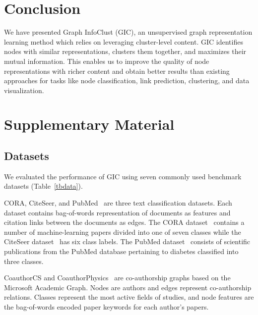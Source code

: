 \documentclass{article}
\begin{document}
\section{Conclusion}
We have presented Graph InfoClust (GIC), an unsupervised graph representation learning method which relies on leveraging cluster-level content. GIC identifies nodes with similar representations, clusters them together, and maximizes their mutual information. This enables us to improve the quality of node representations with richer content and obtain better results than existing approaches for tasks like node classification, link prediction, clustering, and data visualization. 







  



\clearpage
\section{Supplementary Material}









\subsection{Datasets}

We evaluated the performance of GIC using seven commonly used benchmark datasets (Table~\ref{tbdata}). 

CORA, CiteSeer, and PubMed~\cite{sen2008collective,yang2016planetoid} are three text classification datasets.  Each dataset contains bag-of-words representation of documents as features and citation links between the documents as edges. The CORA dataset~\cite{Mccallum00automatingthe} contains a number of machine-learning papers divided into one of seven classes while the CiteSeer dataset~\cite{Giles98CiteSeeran} has six class labels. The PubMed dataset~\cite{namata2012query} consists of scientific publications from the PubMed database pertaining to diabetes classified into three classes.

CoauthorCS and CoauthorPhysics~\cite{shchur2018pitfalls} are co-authorship graphs based on the Microsoft Academic Graph. Nodes are authors and edges represent co-authorship relations. Classes represent the most active fields of studies, and node features are the bag-of-words encoded paper keywords for each author’s papers.
\end{document}
